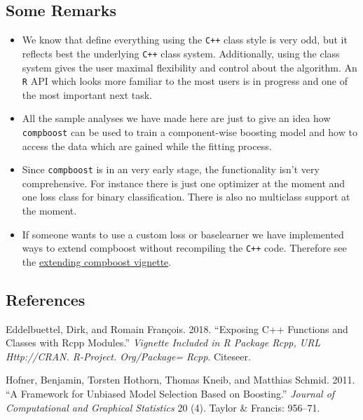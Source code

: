 \documentclass[]{article}
\begin{document}
\subsection{Some Remarks}\label{some-remarks}

\begin{itemize}
\item
  We know that define everything using the \texttt{C++} class style is
  very odd, but it reflects best the underlying \texttt{C++} class
  system. Additionally, using the class system gives the user maximal
  flexibility and control about the algorithm. An \texttt{R} API which
  looks more familiar to the most users is in progress and one of the
  most important next task.
\item
  All the sample analyses we have made here are just to give an idea how
  \texttt{compboost} can be used to train a component-wise boosting
  model and how to access the data which are gained while the fitting
  process.
\item
  Since \texttt{compboost} is in an very early stage, the functionality
  isn't very comprehensive. For instance there is just one optimizer at
  the moment and one loss class for binary classification. There is also
  no multiclass support at the moment.
\item
  If someone wants to use a custom loss or baselearner we have
  implemented ways to extend compboost without recompiling the
  \texttt{C++} code. Therefore see the \href{}{extending compboost
  vignette}.
\end{itemize}

\subsection*{References}\label{references}

\hypertarget{refs}{}
\hypertarget{ref-eddelbuettel2017exposing}{}
Eddelbuettel, Dirk, and Romain François. 2018. ``Exposing C++ Functions
and Classes with Rcpp Modules.'' \emph{Vignette Included in R Package
Rcpp, URL Http://CRAN. R-Project. Org/Package= Rcpp}. Citeseer.

\hypertarget{ref-hofner2011framework}{}
Hofner, Benjamin, Torsten Hothorn, Thomas Kneib, and Matthias Schmid.
2011. ``A Framework for Unbiased Model Selection Based on Boosting.''
\emph{Journal of Computational and Graphical Statistics} 20 (4). Taylor
\& Francis: 956--71.
\end{document}
